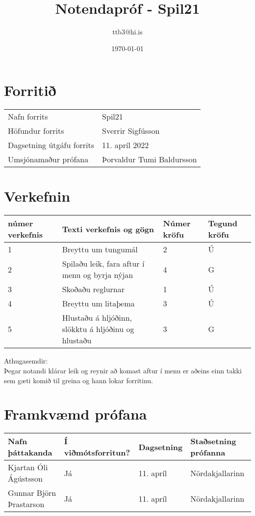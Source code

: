 \documentclass{article}
\title{Notendapróf - Spil21}
\author{ttb3@hi.is}
\date{\today}
\begin{document}
\maketitle

\section{Forritið}
\begin{tabular}{|l|l|}
    \hline
    Nafn forrits & Spil21\\
    Höfundur forrits & Sverrir Sigfússon\\
    Dagsetning útgáfu forrits & 11. apríl 2022\\
    Umsjónamaður prófana& Þorvaldur Tumi Baldursson\\
    \hline
\end{tabular}

\section{Verkefnin}
\begin{tabular}{|l|l|l|l|}
    \hline
    númer verkefnis &Texti verkefnis og gögn                                &Númer kröfu    &Tegund kröfu\\
    \hline
    1               &Breyttu um tungumál                                    &2              &Ú\\
    2               &Spilaðu leik, fara aftur í menu og byrja nýjan         &4              &G\\
    3               &Skoðaðu reglurnar                                      &1              &Ú\\
    4               &Breyttu um litaþema                                    &3              &Ú\\
    5               &Hlustaðu á hljóðinn, slökktu á hljóðinu og hlustaðu    &3              &G\\
    \hline
\end{tabular}
Athugasemdir:
\\Þegar notandi klárar leik og reynir að komast aftur í menu er aðeins einn takki sem gæti komið til greina og hann lokar forritinu.

\section{Framkvæmd prófana}
\begin{tabular}{|l|l|l|l|}
    \hline
    Nafn þáttakanda         &Í viðmótsforritun?     &Dagsetning     &Staðsetning prófanna\\
    \hline
    Kjartan Óli Ágústsson   &Já                     &11. apríl      &Nördakjallarinn\\
    \hline
    Gunnar Björn Þrastarson &Já                     &11. apríl      &Nördakjallarinn\\
    \hline
\end{tabular}
\end{document}

